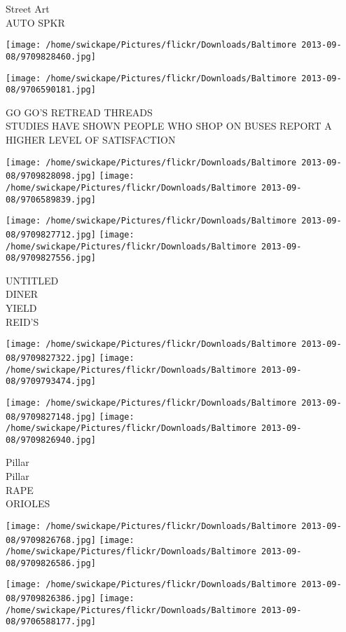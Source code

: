 \documentclass[10pt,letterpaper]{article}
\begin{document}
Street Art\\
AUTO SPKR
\pagebreak

\texttt{[image: /home/swickape/Pictures/flickr/Downloads/Baltimore 2013-09-08/9709828460.jpg]}

\vspace{0.25in}
\texttt{[image: /home/swickape/Pictures/flickr/Downloads/Baltimore 2013-09-08/9706590181.jpg]}

GO GO'S RETREAD THREADS\\
STUDIES HAVE SHOWN PEOPLE WHO SHOP ON BUSES REPORT A HIGHER LEVEL OF SATISFACTION
\pagebreak

\texttt{[image: /home/swickape/Pictures/flickr/Downloads/Baltimore 2013-09-08/9709828098.jpg]}
\texttt{[image: /home/swickape/Pictures/flickr/Downloads/Baltimore 2013-09-08/9706589839.jpg]}

\texttt{[image: /home/swickape/Pictures/flickr/Downloads/Baltimore 2013-09-08/9709827712.jpg]}
\texttt{[image: /home/swickape/Pictures/flickr/Downloads/Baltimore 2013-09-08/9709827556.jpg]}

UNTITLED\\
DINER\\
YIELD\\
REID'S
\pagebreak

\texttt{[image: /home/swickape/Pictures/flickr/Downloads/Baltimore 2013-09-08/9709827322.jpg]}
\texttt{[image: /home/swickape/Pictures/flickr/Downloads/Baltimore 2013-09-08/9709793474.jpg]}

\texttt{[image: /home/swickape/Pictures/flickr/Downloads/Baltimore 2013-09-08/9709827148.jpg]}
\texttt{[image: /home/swickape/Pictures/flickr/Downloads/Baltimore 2013-09-08/9709826940.jpg]}

Pillar\\
Pillar\\
RAPE\\
ORIOLES
\pagebreak

\texttt{[image: /home/swickape/Pictures/flickr/Downloads/Baltimore 2013-09-08/9709826768.jpg]}
\texttt{[image: /home/swickape/Pictures/flickr/Downloads/Baltimore 2013-09-08/9709826586.jpg]}

\texttt{[image: /home/swickape/Pictures/flickr/Downloads/Baltimore 2013-09-08/9709826386.jpg]}
\texttt{[image: /home/swickape/Pictures/flickr/Downloads/Baltimore 2013-09-08/9706588177.jpg]}
\end{document}
